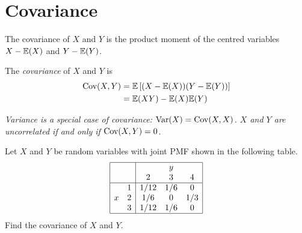 \section{Covariance}
The covariance of $X$ and $Y$ is the product moment of the centred variables $X-\mathbb{E}(X)$ and $Y-\mathbb{E}(Y)$.

\begin{definition}
The \emph{covariance} of $X$ and $Y$ is 
\begin{align*}
\text{Cov}(X,Y) 
	& = \mathbb{E}\left[(X-\mathbb{E}(X))(Y-\mathbb{E}(Y))\right]  \\
	& = \mathbb{E}(XY) - \mathbb{E}(X)\mathbb{E}(Y)
\end{align*}
\end{definition}

\begin{remark}
\ben
\it Variance is a special case of covariance: $\text{Var}(X) = \text{Cov}(X,X)$.
\it $X$ and $Y$ are uncorrelated if and only if $\text{Cov}(X,Y)=0$. 
\een
\end{remark}

\begin{example}
Let $X$ and $Y$ be random variables with joint PMF shown in the following table. 
\[
\begin{array}{|cc|ccc|}\hline
	&       &       & y     &   \\
    &       & 2     & 3     & 4 \\ \hline
	& 1		& 1/12	& 1/6	& 0 		\\ 
x	& 2		& 1/6	& 0		& 1/3 	\\ 
	& 3		& 1/12	& 1/6  	& 0		\\ \hline
\end{array}
\]
Find the covariance of $X$ and $Y$.
\end{example}

